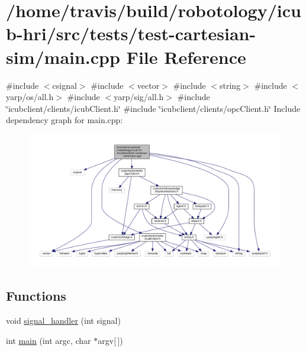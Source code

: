 \hypertarget{tests_2test-cartesian-sim_2main_8cpp}{}\section{/home/travis/build/robotology/icub-\/hri/src/tests/test-\/cartesian-\/sim/main.cpp File Reference}
\label{tests_2test-cartesian-sim_2main_8cpp}
{\ttfamily \#include $<$csignal$>$}\newline
{\ttfamily \#include $<$vector$>$}\newline
{\ttfamily \#include $<$string$>$}\newline
{\ttfamily \#include $<$yarp/os/all.\+h$>$}\newline
{\ttfamily \#include $<$yarp/sig/all.\+h$>$}\newline
{\ttfamily \#include \char`\"{}icubclient/clients/icub\+Client.\+h\char`\"{}}\newline
{\ttfamily \#include \char`\"{}icubclient/clients/opc\+Client.\+h\char`\"{}}\newline
Include dependency graph for main.\+cpp\+:
\nopagebreak
\begin{figure}[H]
\begin{center}
\leavevmode
\includegraphics[width=350pt]{tests_2test-cartesian-sim_2main_8cpp__incl}
\end{center}
\end{figure}
\subsection*{Functions}
\begin{DoxyCompactItemize}
\item 
void \hyperlink{tests_2test-cartesian-sim_2main_8cpp_a3b527c56ed133ee6815bfbc625e757af}{signal\+\_\+handler} (int signal)
\item 
int \hyperlink{tests_2test-cartesian-sim_2main_8cpp_a0ddf1224851353fc92bfbff6f499fa97}{main} (int argc, char $\ast$argv\mbox{[}$\,$\mbox{]})
\end{DoxyCompactItemize}


